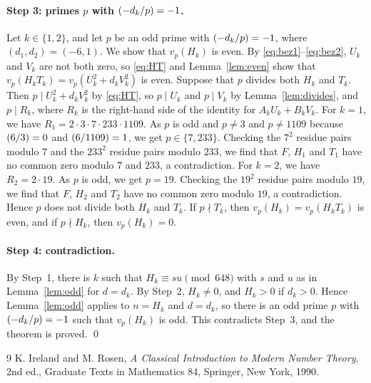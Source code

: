 \documentclass[11pt]{article}
\newcommand{\leg}[2]{\mathchoice{\biggl(\dfrac{#1}{#2}\biggr)}{(#1/#2)}{(#1/#2)}{(#1/#2)}}
\begin{document}
\paragraph{Step 3: primes $p$ with $\leg{-d_k}{p}=-1$.} Let $k\in\{1,2\}$, and let $p$ be an odd prime with $\leg{-d_k}{p}=-1$, where $(d_{1},d_{2})=(-6,1)$. We show that $v_p(H_k)$ is even. By \eqref{eq:bez1}--\eqref{eq:bez2}, $U_k$ and $V_k$ are not both zero, so \eqref{eq:HT} and Lemma~\ref{lem:even} show that $v_p(H_kT_k)=v_p(U_k^2+d_kV_k^2)$ is even. Suppose that $p$ divides both $H_k$ and $T_k$. Then $p\mid U_k^2+d_kV_k^2$ by \eqref{eq:HT}, so $p\mid U_k$ and $p\mid V_k$ by Lemma~\ref{lem:divides}, and $p\mid R_k$, where $R_k$ is the right-hand side of the identity for $A_kU_k+B_kV_k$. For $k=1$, we have $R_{1}=2\cdot 3\cdot 7\cdot 233\cdot 1109$. As $p$ is odd and $p\neq3$ and $p\neq1109$ because $\leg{6}{3}=0$ and $\leg{6}{1109}=1$, we get $p\in\{7,233\}$. Checking the $7^2$ residue pairs modulo $7$ and the $233^2$ residue pairs modulo $233$, we find that $F$, $H_{1}$ and $T_{1}$ have no common zero modulo $7$ and $233$, a contradiction. For $k=2$, we have $R_{2}=2\cdot 19$. As $p$ is odd, we get $p=19$. Checking the $19^2$ residue pairs modulo $19$, we find that $F$, $H_{2}$ and $T_{2}$ have no common zero modulo $19$, a contradiction. Hence $p$ does not divide both $H_k$ and $T_k$. If $p\nmid T_k$, then $v_p(H_k)=v_p(H_kT_k)$ is even, and if $p\nmid H_k$, then $v_p(H_k)=0$.

\paragraph{Step 4: contradiction.} By Step~1, there is $k$ such that $H_k\equiv su\pmod{648}$ with $s$ and $u$ as in Lemma~\ref{lem:odd} for $d=d_k$. By Step~2, $H_k\neq0$, and $H_k>0$ if $d_k>0$. Hence Lemma~\ref{lem:odd} applies to $n=H_k$ and $d=d_k$, so there is an odd prime $p$ with $\leg{-d_k}{p}=-1$ such that $v_p(H_k)$ is odd. This contradicts Step~3, and the theorem is proved.
\qed

\begin{thebibliography}{9}
 K. Ireland and M. Rosen, \emph{A Classical Introduction to Modern Number Theory}, 2nd ed., Graduate Texts in Mathematics 84, Springer, New York, 1990.
\end{thebibliography}
\end{document}
